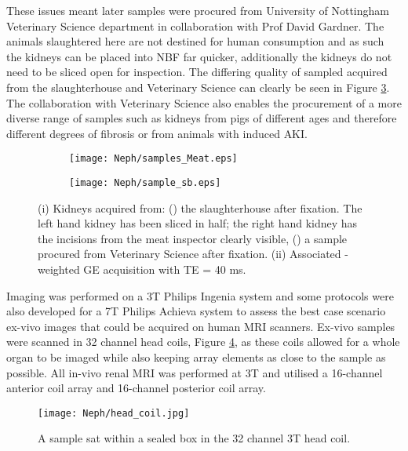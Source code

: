 These issues meant later samples were procured from University of Nottingham Veterinary Science department in collaboration with Prof David Gardner. The animals slaughtered here are not destined for human consumption and as such the kidneys can be placed into \ac{NBF} far quicker, additionally the kidneys do not need to be sliced open for inspection. The differing quality of sampled acquired from the slaughterhouse and Veterinary Science can clearly be seen in Figure \ref{fig:ex_samples}. The collaboration with Veterinary Science also enables the procurement of a more diverse range of samples such as kidneys from pigs of different ages and therefore different degrees of fibrosis or from animals with induced \ac{AKI}.  

\begin{figure}[H]
	\centering
	\begin{subfigure}[c]{0.47\textwidth}
		\centering
		\texttt{[image: Neph/samples\_Meat.eps]}
		\caption{}
		\label{fig:ex_samples_meat}
	\end{subfigure}
	\hfill
	\begin{subfigure}[c]{0.47\textwidth}
		\centering
		\texttt{[image: Neph/sample\_sb.eps]}
		\caption{}
		\label{fig:ex_samples_sb}
	\end{subfigure}
	\caption{(i) Kidneys acquired from: () the slaughterhouse after fixation. The left hand kidney has been sliced in half; the right hand kidney has the incisions from the meat inspector clearly visible, () a sample procured from Veterinary Science after fixation. (ii) Associated \ttwo-weighted \ac*{GE} acquisition with TE = 40 ms.}
	\label{fig:ex_samples}
\end{figure}

Imaging was performed on a 3T Philips Ingenia system and some protocols were also developed for a 7T Philips Achieva system to assess the best case scenario ex-vivo images that could be acquired on human \ac{MRI} scanners. Ex-vivo samples were scanned in 32 channel head coils, Figure \ref{fig:ex_head_coil}, as these coils allowed for a whole organ to be imaged while also keeping array elements as close to the sample as possible. All in-vivo renal \ac{MRI} was performed at 3T and utilised a 16-channel anterior coil array and 16-channel posterior coil array.

\begin{figure}[H]
	\centering
	\texttt{[image: Neph/head\_coil.jpg]}
	\caption{A sample sat within a sealed box in the 32 channel 3T head coil.}
	\label{fig:ex_head_coil}	
\end{figure}

